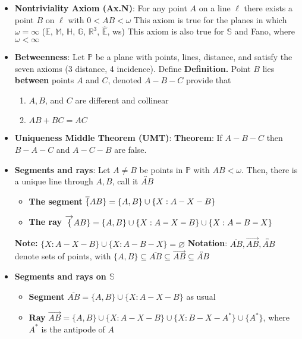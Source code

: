 \documentclass{report}
\begin{document}
\begin{itemize}
    \item \textbf{Nontriviality Axiom (Ax.N)}: For any point $A$ on a line $\ell$ there exists a point $B$ on $\ell$ with $0 < AB < \omega$
        \bigbreak \noindent 
        This axiom is true for the planes in which $\omega = \infty$ ($\mathbb{E}$, $\mathbb{M}$, $\mathbb{H}$, $\mathbb{G}$, $\mathbb{R}^{3}$, $\hat{\mathbb{E}} $, ws)
        \bigbreak \noindent 
        This axiom is also true for $\mathbb{S}$ and Fano, where $\omega < \infty $
    \item \textbf{Betweenness}: Let $\mathbb{P}$ be a plane with points, lines, distance, and satisfy the seven axioms (3 distance, 4 incidence). Define
        \bigbreak \noindent 
        \textbf{Definition.} Point $B$ lies \textbf{between} points $A$ and $C$, denoted $A-B-C$ provide that
        \begin{enumerate}
            \item $A,B$, and $C$ are different and collinear
            \item $AB + BC = AC $
        \end{enumerate}
    \item \textbf{Uniqueness Middle Theorem (UMT)}:
        \bigbreak \noindent 
        \textbf{Theorem}: If $A-B-C$ then $B-A-C$ and $A-C-B$ are false.
    \item \textbf{Segments and rays}: Let $A\ne B$ be points in $ \mathbb{P}$ with $AB < \omega $. Then, there is a unique line through $A,B$, call it $ \overleftrightarrow{AB}$ 
        \begin{itemize}
            \item \textbf{The segment} $\overline\{AB\} = \{A,B\} \cup \{X: A-X-B\}$
            \item \textbf{The ray} $\overrightarrow\{AB\} = \{A,B\} \cup \{X: A-X-B\} \cup \{X: A-B-X\}$
        \end{itemize}
        \textbf{Note:} $\{X: A-X-B\} \cup \{X: A-B-X\} = \varnothing$
        \bigbreak \noindent 
        \textbf{Notation}: $\overline{AB}, \overrightarrow{AB}, \overleftrightarrow{AB}$ denote sets of points, with $\{A,B\} \subseteq \overline{AB} \subseteq \overrightarrow{AB} \subseteq \overleftrightarrow{AB}$
    \item \textbf{Segments and rays on $\mathbb{S}$}
        \begin{itemize}
            \item \textbf{Segment} $\overline{AB} = \{A,B\} \cup \{X: A-X-B\}$ as usual
            \item \textbf{Ray} $\overrightarrow{AB} = \{A,B\} \cup \{X: A-X-B\} \cup \{X: B-X-A^{*}\} \cup \{A^{*}\}$, where $A^{*}$ is the antipode of $A$

\end{itemize}
\end{itemize}
\end{document}

